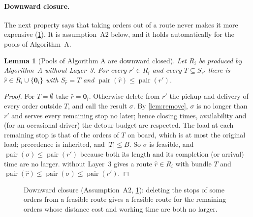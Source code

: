 \documentclass[11pt]{article}
\newtheorem{plemma}{Lemma}
\theoremstyle{definition}
\theoremstyle{remark}
\newcommand{\idle}{\mathbf{0}}
\newcommand{\pair}{\operatorname{pair}}
\begin{document}
\paragraph{Downward closure.}
The next property says that taking orders out of a route never makes it more
expensive (\cref{fig:downward}). It is assumption~A2 below, and it holds
automatically for the pools of Algorithm~A.

\begin{plemma}[Pools of Algorithm A are downward closed]\label{lem:downward}
Let $R_i$ be produced by Algorithm~A without Layer~3. For every $r'\in R_i$ and
every $T\subseteq S_{r'}$ there is $\hat r\in R_i\cup\{\idle_i\}$ with
$S_{\hat r}=T$ and $\pair(\hat r)\le\pair(r')$.
\end{plemma}

\begin{proof}
For $T=\emptyset$ take $\hat r=\idle_i$. Otherwise delete from $r'$ the pickup
and delivery of every order outside $T$, and call the result $\sigma$. By
\cref{lem:remove}, $\sigma$ is no longer than $r'$ and serves every remaining
stop no later; hence closing times, availability and (for an occasional driver)
the detour budget are respected. The load at each remaining stop is that of the
orders of $T$ on board, which is at most the original load; precedence is
inherited, and $|T|\le B$. So $\sigma$ is feasible, and $\pair(\sigma)\le\pair(r')$
because both its length and its completion (or arrival) time are no larger.
 without Layer~3 gives a route $\hat r\in R_i$ with bundle
$T$ and $\pair(\hat r)\le\pair(\sigma)\le\pair(r')$.
\end{proof}

\begin{figure}[!htbp]
\centering
{}
\caption{Downward closure (Assumption~A2, \cref{lem:downward}): deleting the
stops of some orders from a feasible route gives a feasible route for the
remaining orders whose distance cost and working time are both no larger.}
\label{fig:downward}
\end{figure}
\end{document}
